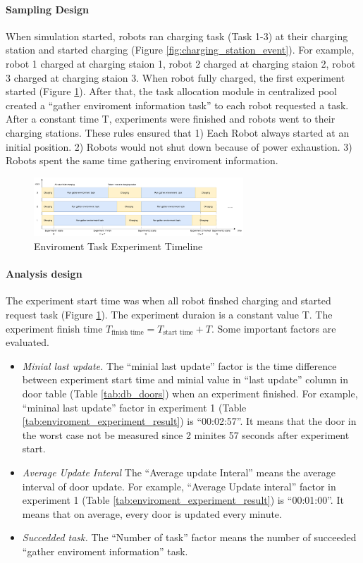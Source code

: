 \paragraph{Sampling Design} When simulation started, robots ran charging task (Task 1-3) at their charging station and started charging (Figure \ref{fig:charging_station_event}). For example, robot 1 charged at charging staion 1, robot 2 charged at charging staion 2, robot 3 charged at charging staion 3. When robot fully charged, the first experiment started (Figure \ref{tab:env_exp_timeline}). After that, the task allocation module in centralized pool created a ``gather enviroment information task'' to each robot requested a task. After a constant time T, experiments were finished and robots went to their charging stations. These rules ensured that 1) Each Robot always started at an initial position. 2) Robots would not shut down because of power exhaustion. 3) Robots spent the same time gathering enviroment information.

\begin{figure}[htbp]
    \centering
    \includegraphics[width = 0.7\textwidth]{content/images/ch5/env_exp_timeline.drawio.png}
    \caption{Enviroment Task Experiment Timeline}
    \label{tab:env_exp_timeline}
\end{figure}

\paragraph{Analysis design} The experiment start time was when all robot finshed charging and started request task (Figure \ref{tab:env_exp_timeline}). The experiment duraion is a constant value T. The experiment finish time $T_{\mbox{finish time}} = T_{\mbox{start time}} + T $. Some important factors are evaluated. 

\begin{itemize}
    \item \textsl{Minial last update.} The ``minial last update'' factor is the time difference between experiment start time and minial value in ``last update'' column in door table (Table \ref{tab:db_doors}) when an experiment finished. For example, ``mininal last update'' factor in experiment 1 (Table \ref{tab:enviroment_experiment_result}) is ``00:02:57''. It means that the door in the worst case not be measured since 2 minites 57 seconds after experiment start.
    \item \textsl{Average Update Interal} The ``Average update Interal'' means the average interval of door update. For example, ``Average Update interal'' factor in experiment 1 (Table \ref{tab:enviroment_experiment_result}) is ``00:01:00''. It means that on average, every door is updated every minute.
    \item \textsl{Succedded task.} The ``Number of task'' factor  means the number of succeeded ``gather enviroment information'' task.
\end{itemize}


